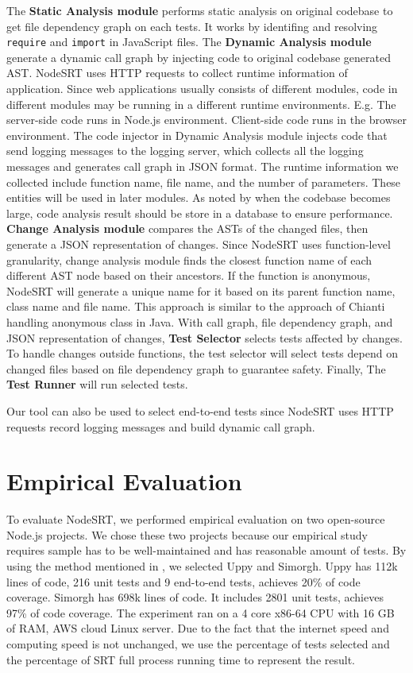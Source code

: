 \documentclass[10pt, conference]{IEEEtran}
\begin{document}
 The \textbf{Static Analysis module} performs static analysis on original codebase to get file dependency
graph on each tests. It works by identifing and resolving \verb|require| and \verb|import| in JavaScript files. 
The \textbf{Dynamic Analysis module} generate a dynamic call graph by injecting code to original codebase 
generated AST. 
NodeSRT uses HTTP requests to collect runtime information of application. Since web applications usually consists of different modules, code in 
different modules may be running in a different runtime environments. E.g. The server-side code runs in Node.js 
environment. Client-side code runs in the browser environment. The code injector in Dynamic Analysis module injects code that send logging messages to 
the logging server, which collects all the logging messages and generates call graph in JSON format. The runtime information we collected include function name, file name, and the number of parameters. 
These entities will be used in later modules. As noted by \cite{b2, b4} when the codebase becomes large, code analysis result should be store in a database to ensure performance. 
\textbf{Change Analysis module} compares the ASTs of the changed files, then generate a JSON representation of changes. Since NodeSRT uses function-level 
granularity, change analysis module finds the closest function name of each different AST node based on their ancestors. 
If the function is anonymous, NodeSRT will generate a unique name for it based on its parent function name, class name and file name. 
This approach is similar to the approach of Chianti \cite{b12} handling anonymous class in Java. With call graph, file dependency graph, 
and JSON representation of changes, \textbf{Test Selector} selects tests affected by changes. To handle changes outside 
functions, the test selector will select tests depend on changed files based on file dependency graph to guarantee safety. 
Finally, The \textbf{Test Runner} will run selected tests.

Our tool can also be used to select end-to-end tests since NodeSRT uses HTTP requests 
record logging messages and build dynamic call graph.

\section{Empirical Evaluation}

To evaluate NodeSRT, we performed empirical evaluation on two open-source Node.js projects. We chose these two projects because 
our empirical study requires sample has to be well-maintained and has reasonable amount of tests. By using the method mentioned in \cite{b10}, 
we selected Uppy and Simorgh. Uppy has 112k lines of code, 216 unit tests and 9 end-to-end tests, 
achieves 20\% of code coverage. Simorgh has 698k lines of code. 
It includes 2801 unit tests, achieves 97\% of code coverage. The 
experiment ran on a 4 core x86-64 CPU with 16 GB of RAM, AWS cloud Linux server. Due to the fact that the internet speed and computing speed is not 
unchanged, we use the percentage of tests selected and the percentage of SRT full process running time to 
represent the result. 
\end{document}
